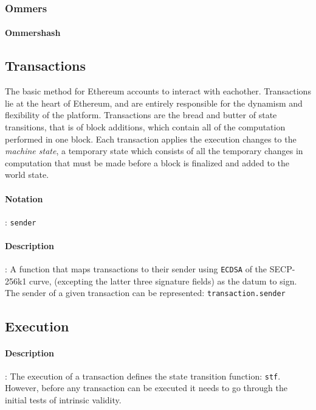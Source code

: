 \documentclass[10pt,a4paper,leqno,bibliography=totoc]{scrartcl}
\newenvironment{alphafootnotes}
{\par\edef\savedfootnotenumber{\number\value{footnote}}
\renewcommand{\thefootnote}{\alph{footnote}}
\setcounter{footnote}{0}}
{\par\setcounter{footnote}{\savedfootnotenumber}}
\begin{document}
\begin{alphafootnotes}
\begin{multicols*}{2}
			\subsubsection{Ommers}
				\paragraph{Ommershash}

		\subsection{Transactions}
			The basic method for Ethereum accounts to interact with eachother. Transactions lie at the heart of Ethereum, and are entirely responsible for the dynamism and flexibility of the platform. Transactions are the bread and butter of state transitions, that is of block additions, which contain all of the computation performed in one block. Each transaction applies the execution changes to the \textit{machine state}, a temporary state which consists of all the temporary changes in computation that must be made before a block is finalized and added to the world state.
\paragraph{Notation}: \texttt{sender}
\paragraph{Description}: A function that maps transactions to their sender using \texttt{ECDSA} of the SECP-256k1 curve, (excepting the latter three signature fields) as the datum to sign. The sender of a given transaction can be represented:
\texttt{transaction.sender}

		\subsection{Execution}
			\paragraph{Description}: The execution of a transaction defines the state transition function: \texttt{stf}. However, before any transaction can be executed it needs to go through the initial tests of intrinsic validity. 

\end{multicols*}
\end{alphafootnotes}
\end{document}
